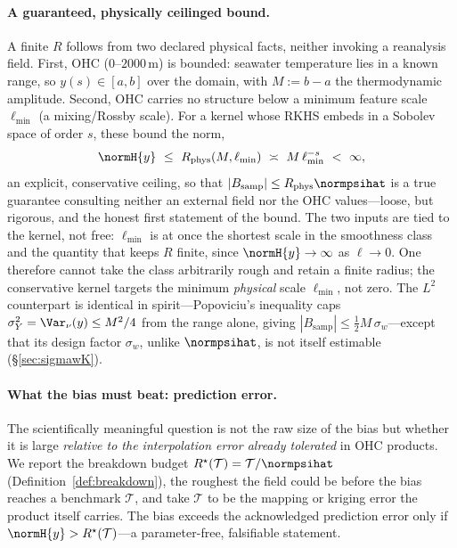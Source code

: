 \paragraph{A guaranteed, physically ceilinged bound.}
A finite $R$ follows from two declared physical facts, neither invoking a
reanalysis field. First, OHC ($0$--$2000$\,m) is bounded: seawater temperature
lies in a known range, so $y(s)\in[a,b]$ over the domain, with $M:=b-a$ the
thermodynamic amplitude. Second, OHC carries no structure below a minimum feature
scale $\ell_{\min}$ (a mixing/Rossby scale). For a kernel whose RKHS embeds in a
Sobolev space of order $s$, these bound the norm,
\[
  \normH{y}\ \le\ R_{\mathrm{phys}}(M,\ell_{\min})\ \asymp\ M\,\ell_{\min}^{-s}\ <\ \infty ,
\]
an explicit, conservative ceiling, so that $|B_{\mathrm{samp}}|\le
R_{\mathrm{phys}}\normpsihat$ is a true guarantee consulting neither an external
field nor the OHC values---loose, but rigorous, and the honest first statement of
the bound. The two inputs are tied to the kernel, not free: $\ell_{\min}$ is at
once the shortest scale in the smoothness class and the quantity that keeps $R$
finite, since $\normH{y}\to\infty$ as $\ell\to0$. One therefore cannot take the
class arbitrarily rough and retain a finite radius; the conservative kernel
targets the minimum \emph{physical} scale $\ell_{\min}$, not zero. The $L^2$
counterpart is identical in spirit---Popoviciu's inequality caps
$\sigma_Y^2=\Var_\nu(y)\le M^2/4$ from the range alone, giving
$|B_{\mathrm{samp}}|\le\tfrac12 M\,\sigma_w$---except that its design factor
$\sigma_w$, unlike $\normpsihat$, is not itself estimable (\S\ref{sec:sigmawK}).

\paragraph{What the bias must beat: prediction error.}
The scientifically meaningful question is not the raw size of the bias but whether
it is large \emph{relative to the interpolation error already tolerated} in OHC
products. We report the breakdown budget
$R^{\star}(\mathcal T)=\mathcal T/\normpsihat$ (Definition~\ref{def:breakdown}),
the roughest the field could be before the bias reaches a benchmark $\mathcal T$,
and take $\mathcal T$ to be the mapping or kriging error the product itself
carries. The bias exceeds the acknowledged prediction error only if
$\normH{y}>R^{\star}(\mathcal T)$---a parameter-free, falsifiable statement.

